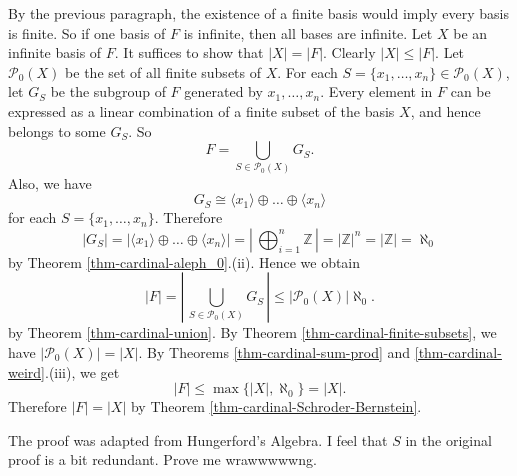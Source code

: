 \begin{sketch}
	By the previous paragraph, the existence of a finite basis would imply every basis is finite. So if one basis of $F$ is infinite, then all bases are infinite. Let $X$ be an infinite basis of $F$. It suffices to show that $|X|=|F|$. Clearly $|X| \le |F|$. Let $ \mathcal{P}_0(X)$ be the set of all finite subsets of $X$.  For each $S=\{x_1, \dots, x_n\} \in \mathcal{P}_0(X)$, let $G_S$ be the subgroup of $F$ generated by $ x_1, \dots, x_n$. Every element in $F$ can be expressed as a linear combination of a finite subset of the basis $X$, and hence belongs to some $G_S$. So 
	\begin{equation*}
		F = \bigcup_{S \in \mathcal{P}_0(X)} G_S.
	\end{equation*}
	Also, we have 
	\begin{equation*}
	G_S \cong \langle x_1 \rangle \oplus \dots \oplus \langle x_n \rangle
	\end{equation*} for each $S = \{x_1,\dots, x_n\}$. Therefore
	\begin{equation*}
		|G_S| = |\langle x_1 \rangle \oplus \dots \oplus \langle x_n \rangle| = \left|\,\bigoplus_{i=1}^n \mathbb{Z}\,\right|= |\mathbb{Z}|^n = |\mathbb{Z}| = \aleph_0
	\end{equation*} by Theorem \ref{thm-cardinal-aleph_0}.(ii).  Hence  we obtain
	\begin{equation*}
		|F| = \left|\,\bigcup_{S \in \mathcal{P}_0(X)} G_S\,\right| \le |\mathcal{P}_0(X)|\aleph_0.
	\end{equation*} by Theorem \ref{thm-cardinal-union}. By Theorem \ref{thm-cardinal-finite-subsets}, we have $|\mathcal{P}_0(X)| = |X|$. By Theorems \ref{thm-cardinal-sum-prod} and \ref{thm-cardinal-weird}.(iii), we get  $$|F| \le  \max\{|X|,\aleph_0\} =   |X|.$$ Therefore $|F| = |X|$ by Theorem \ref{thm-cardinal-Schroder-Bernstein}. 
\end{sketch}
\begin{remark}
	The proof was adapted from Hungerford's Algebra. I feel that $S$ in the original proof is a bit redundant. Prove me wrawwwwwng.
\end{remark}

